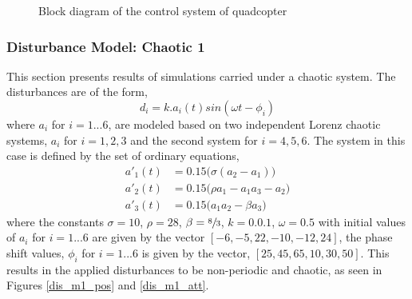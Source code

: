 \documentclass{article}
\begin{document}
\begin{figure}
\begin{centering}
{
    \label{sliding_array}
	\caption{Block diagram of the control system of quadcopter}	
	}
\end{centering}
\end{figure}
\subsubsection{Disturbance Model: Chaotic 1}
This section presents results of simulations carried under a chaotic system. The disturbances are of the form,
\begin{equation}
d_i = k.a_i(t)sin(\omega t-\phi_i)
\end{equation}
where $a_i$ for $i=1...6$, are modeled based on two independent Lorenz chaotic systems, $a_i$ for $i=1,2,3$ and the second system for $i=4,5,6$. The system in this case is defined by the set of ordinary equations, 
\begin{subequations}
\begin{align}
a'_1(t) &= 0.15\big(\sigma(a_2-a_1)\big)\\
a'_2(t) &= 0.15\big(\rho a_1 - a_1 a_3 - a_2\big)\\
a'_3(t) &= 0.15\big(a_1 a_2 - \beta a_3\big)
\end{align}
\end{subequations}
where the constants $\sigma=10$, $\rho=28$, $\beta=\sfrac{8}{3}$, $k=0.0.1$, $\omega=0.5$ with initial values of $a_i$ for $i=1...6$ are given by the vector $[-6,-5,22,-10,-12,24]$, the phase shift values, $\phi_i$ for $i=1...6$ is given by the vector, $[25,45,65,10,30,50]$. This results in the applied disturbances to be non-periodic and chaotic, as seen in Figures \ref{dis_m1_pos} and \ref{dis_m1_att}.
\end{document}
